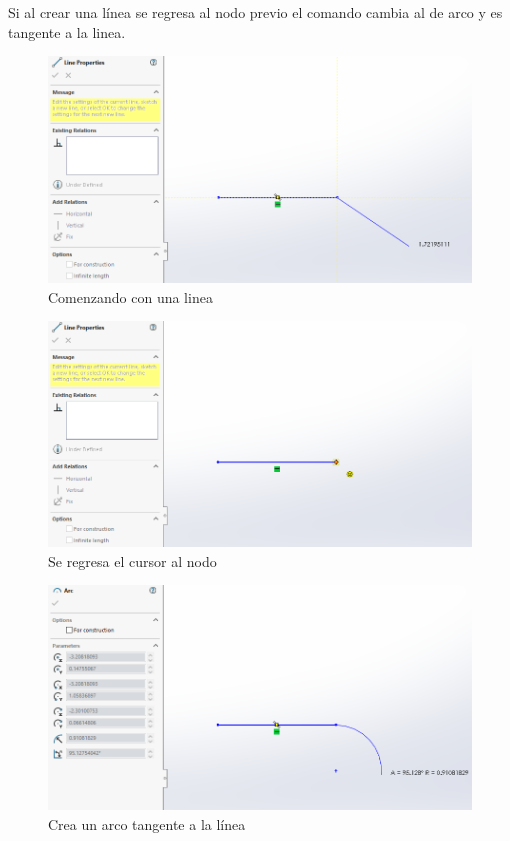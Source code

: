 \documentclass{report}
\begin{document}
Si al crear una línea se regresa al nodo previo el comando cambia al de arco y es tangente a la linea.

\begin{figure}[H]
	\centering
	\includegraphics[width=0.85\linewidth, height=0.5\textheight,keepaspectratio]{Imagenes/solidworks_curvaconlinea01}
	\caption{Comenzando con una linea}
	\label{fig:solidworkscurvaconlinea01}
\end{figure}

\begin{figure}[H]
	\centering
	\includegraphics[width=0.85\linewidth, height=0.5\textheight,keepaspectratio]{Imagenes/solidworks_curvaconlinea02}
	\caption{Se regresa el cursor al nodo}
	\label{fig:solidworkscurvaconlinea02}
\end{figure}
\begin{figure}[H]
	\centering
	\includegraphics[width=0.85\linewidth, height=0.5\textheight,keepaspectratio]{Imagenes/solidworks_curvaconlinea03}
	\caption{Crea un arco tangente a la línea}
	\label{fig:solidworkscurvaconlinea03}
\end{figure}
\end{document}
